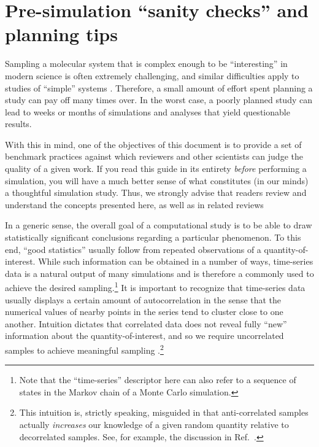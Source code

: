 \section{Pre-simulation ``sanity checks'' and planning tips}
\label{sec:sanity}

Sampling a molecular system that is complex enough to be ``interesting'' in modern science is often extremely challenging, and similar difficulties apply to studies of ``simple'' systems \cite{Schappals2017}.
Therefore, a small amount of effort spent planning a study can pay off many times over.  In the worst case, a poorly planned study can lead to weeks or months of simulations and analyses that yield questionable results.

With this in mind, one of the objectives of this document is to provide a set of benchmark practices against which reviewers and other scientists can judge the quality of a given work.  If you read this guide in its entirety \emph{before} performing a simulation, you will have a much better sense of what constitutes (in our minds) a thoughtful simulation study.  Thus, we strongly advise that readers review and understand the concepts presented here, as well as in related reviews \cite{Grossfield2009,JCGM:GUM2008,PatroneUQreview}


In a generic sense, the overall goal of a computational study is to be able to draw statistically significant conclusions regarding a particular phenomenon.  To this end, ``good statistics'' usually follow from repeated observations of a quantity-of-interest.  While such information can be obtained in a number of ways, time-series data is a natural output of many simulations and is therefore a commonly used to achieve the desired sampling.\footnote{Note that the ``time-series'' descriptor here can also refer to a sequence of states in the Markov chain of a Monte Carlo simulation.}  
It is important to recognize that time-series data usually displays a certain amount of autocorrelation in the sense that the numerical values of nearby points in the series tend to cluster close to one another.  Intuition dictates that correlated data does not reveal fully ``new'' information about the quantity-of-interest, and so we require uncorrelated samples to achieve meaningful sampling \cite{PatroneAIAA}.\footnote{This intuition is, strictly speaking, misguided in that anti-correlated samples actually {\it increases} our knowledge of a given random quantity relative to decorrelated samples.  See, for example, the discussion in Ref.~\cite{PatroneAIAA}.}

